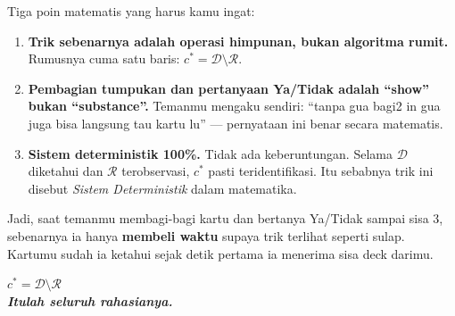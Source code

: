 \documentclass[11pt,a4paper]{article}
\theoremstyle{definition}
\begin{document}
Tiga poin matematis yang harus kamu ingat:

\begin{enumerate}[label=\textbf{\arabic*.}, leftmargin=*]
    \item \textbf{Trik sebenarnya adalah operasi himpunan, bukan algoritma rumit.} Rumusnya cuma satu baris: $c^* = \mathcal{D} \setminus \mathcal{R}$.
    
    \item \textbf{Pembagian tumpukan dan pertanyaan Ya/Tidak adalah ``show'' bukan ``substance''.} Temanmu mengaku sendiri: ``tanpa gua bagi2 in gua juga bisa langsung tau kartu lu'' --- pernyataan ini benar secara matematis.
    
    \item \textbf{Sistem deterministik 100\%.} Tidak ada keberuntungan. Selama $\mathcal{D}$ diketahui dan $\mathcal{R}$ terobservasi, $c^*$ pasti teridentifikasi. Itu sebabnya trik ini disebut \emph{Sistem Deterministik} dalam matematika.
\end{enumerate}

Jadi, saat temanmu membagi-bagi kartu dan bertanya Ya/Tidak sampai sisa 3, sebenarnya ia hanya \textbf{membeli waktu} supaya trik terlihat seperti sulap. Kartumu sudah ia ketahui sejak detik pertama ia menerima sisa deck darimu.

\vspace{1em}
\begin{center}
\Large\bfseries $c^* = \mathcal{D} \setminus \mathcal{R}$ \\[0.3em]
\normalsize \emph{Itulah seluruh rahasianya.}
\end{center}
\end{document}
